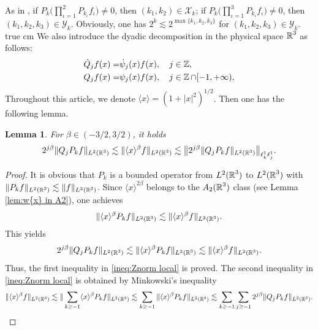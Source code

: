 \documentclass[11pt,twoside]{article}
\def\cX{\mathcal X}
\def\cY{\mathcal Y}
\def\Z{\mathop{\mathbb Z\kern 0pt}\nolimits}
\def\R{\mathop{\mathbb R\kern 0pt}\nolimits}
\def\ls{\lesssim}
\newcommand{\w}[1]{\langle {#1} \rangle}
\newcommand{\q}{\dot{Q}}
\theoremstyle{plain}
\newtheorem{lemma}[theorem]{Lemma}
\theoremstyle{definition}
\numberwithin{equation}{section}
\begin{document}
As in \cite[page 799]{IP13}, if $P_k\big(\prod_{\iota=1}^2 P_{k_\iota}f_\iota\big)\neq0$,
then $(k_1,k_2)\in\cX_k$; if $P_k\big(\prod_{\iota=1}^3 P_{k_\iota}f_\iota\big)\neq0$, then $(k_1,k_2,k_3)\in\cY_k$.
Obviously, one has $2^k\ls 2^{\max\{k_1,k_2,k_3\}}$ for $(k_1,k_2,k_3)\in\cY_k$.
 true cm
We also introduce the dyadic decomposition in the physical space $\R^3$ as follows:
	\begin{equation}\label{def:Q_j}
		\begin{split}
			\q_jf(x)=&\dot{\psi}_j(x)f(x),\quad j\in\Z,\\
			Q_jf(x)=&\psi_j(x)f(x), \quad j\in\Z\cap[-1,+\infty),\\
		\end{split}
	\end{equation}
	Throughout this article, we denote $\w{x} = (1+|x|^2)^{1/2}$. Then one has the following lemma.
	\begin{lemma}\label{lem:Qj prop}
		For $\beta\in(-3/2,3/2)$, it holds
		\begin{equation}\label{ineq:Znorm local}
			2^{j\beta}\|Q_jP_kf\|_{L^2(\R^3)}\ls\|\w{x}^{\beta}f\|_{L^2(\R^3)}
			\ls\big\|2^{j\beta}\|Q_jP_kf\|_{L^2(\R^3)}\big\|_{\ell^1_k\ell^1_j}.
		\end{equation}
	\end{lemma}
	\begin{proof}
It is obvious that $P_k$ is a bounded operator from $L^2(\R^3)$ to $L^2(\R^3)$ with $\|P_kf\|_{L^2(\R^3)}\ls\|f\|_{L^2(\R^3)}$.
Since $\w{x}^{2\beta}$ belongs to the $A_2(\R^3)$ class (see Lemma \ref{lem:w{x} in A2}),
one achieves
 \begin{equation*}
 \|\w{x}^{\beta}P_kf\|_{L^2(\R^3)}\ls\|\w{x}^{\beta}f\|_{L^2(\R^3)}.
 \end{equation*}
This yields
		\begin{equation*}
			2^{j\beta}\|Q_jP_kf\|_{L^2(\R^3)}\ls\|\w{x}^{\beta}P_kf\|_{L^2(\R^3)}
			\ls\|\w{x}^{\beta}f\|_{L^2(\R^3)}.
		\end{equation*}
Thus, the first inequality in \eqref{ineq:Znorm local} is proved.
The second inequality in \eqref{ineq:Znorm local} is obtained by Minkowski's inequality
\begin{equation*}
\|\w{x}^{\beta}f\|_{L^2(\R^3)}\ls\|\sum_{k\ge-1}\w{x}^{\beta}P_kf\|_{L^2(\R^3)}
\ls\sum_{k\ge-1}\|\w{x}^{\beta}P_kf\|_{L^2(\R^3)}
\ls\sum_{k\ge-1}\sum_{j\ge-1}2^{j\beta}\|Q_jP_kf\|_{L^2(\R^3)}.
\end{equation*}
\end{proof}
\end{document}
